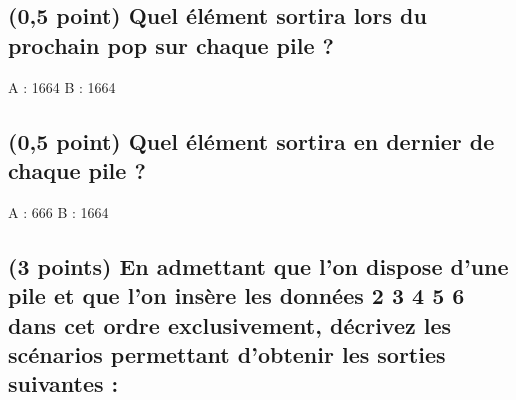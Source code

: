\documentclass[11pt,a4paper]{article}
\begin{document}
\bigskip


\subsection{(0,5 point) Quel élément sortira lors du prochain \og pop \fg{} sur chaque pile ? }

\bigskip
\bigskip

\begin{Large}
A : 1664 \hspace{8cm}  B : 1664
\end{Large}

\bigskip
\bigskip


\subsection{(0,5 point) Quel élément sortira en dernier de chaque pile ? }

\bigskip
\bigskip

\begin{Large}
A : 666 \hspace{8cm}  B : 1664
\end{Large}

\bigskip
\bigskip



\hspace{0pt}
\vfill

\newpage

\vfillFirst

\subsection{(3 points) En admettant que l'on dispose d'une pile et que l'on insère les données  2 3 4 5 6 \fg{} dans cet ordre exclusivement, décrivez les scénarios permettant d'obtenir les sorties suivantes : }
\end{document}
